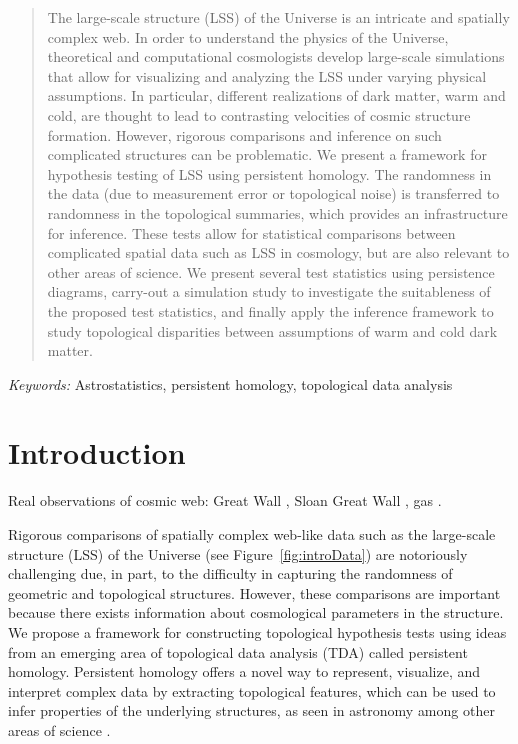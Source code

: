 \documentclass[12pt]{article}
\newcommand{\figref}[1]{Figure~\ref{#1}}
\begin{document}
\bigskip
\begin{abstract}
The large-scale structure (LSS) of the Universe is an intricate and spatially complex web. In order to understand the physics of the Universe, theoretical and computational cosmologists develop large-scale simulations that allow for visualizing and analyzing the LSS under varying physical assumptions. In particular, different realizations of dark matter, warm and cold, are thought to lead to contrasting velocities of cosmic structure formation. However, rigorous comparisons and inference on such complicated structures can be problematic.  We present a framework for hypothesis testing of LSS using persistent homology. The randomness in the data (due to measurement error or topological noise) is transferred to randomness in the topological summaries, which provides an infrastructure for inference. These tests allow for statistical comparisons between complicated spatial data such as LSS in cosmology, but are also relevant to other areas of science. We present several test statistics using persistence diagrams, carry-out a simulation study to investigate the suitableness of the proposed test statistics, and finally apply the inference framework to study topological disparities between assumptions of warm and cold dark matter.
\end{abstract}

\noindent%
{\it Keywords:} Astrostatistics, persistent homology, topological data analysis 


\section{Introduction}
\label{sec:intro}

{\color{blue} Real observations of cosmic web:  Great Wall \citep{geller1989mapping}, Sloan Great Wall \citep{gott2005map}, gas \citep{cantalupo2014cosmic}.}

Rigorous comparisons of spatially complex web-like data such as the large-scale structure (LSS) of the Universe (see \figref{fig:introData}) are notoriously challenging due, in part, to the difficulty in capturing the randomness of geometric and topological structures.  However, these comparisons are important because there exists information about cosmological parameters in the structure. We propose a framework for constructing topological hypothesis tests using ideas from an emerging area of topological data analysis (TDA) called persistent homology. Persistent homology offers a novel way to represent, visualize, and interpret complex data by extracting topological features, which can be used to infer properties of the underlying structures, as seen in astronomy \citep{Sousbie2011, SousbieEtAl2011, van2011alpha,cisewski2014non} among other areas of science \citep{bendich2014persistent, duong2012closed}.
\end{document}
